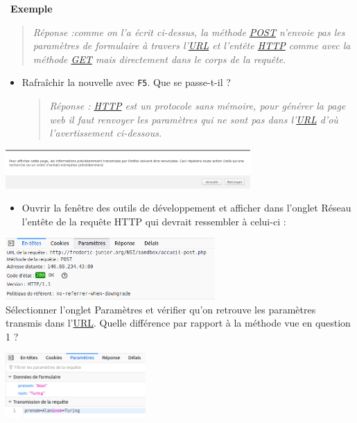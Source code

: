 \documentclass[
  11pt,
]{article}
\newcommand{\passthrough}[1]{#1}
\providecommand{\tightlist}{%
  \setlength{\itemsep}{0pt}\setlength{\parskip}{0pt}}
\newcounter{exple}
\newenvironment{exemple}[1]
{\par \medskip   \addtocounter{exple}{1} \noindent  
\begin{bclogo}[arrondi =0.1,   noborder = true, logo=\bclampe, marge=4]{~\textbf{Exemple} \textbf{\theexple} {\itshape #1} }  \par}
{
\end{bclogo}
 \par \bigskip }
\begin{document}
\begin{exemple}{}
\begin{enumerate}
  \begin{quote}
  \emph{Réponse :comme on l'a écrit ci-dessus, la méthode \url{POST}
  n'envoie pas les paramètres de formulaire à travers l'\url{URL} et
  l'entête \url{HTTP} comme avec la méthode \url{GET} mais directement
  dans le corps de la requête}.
  \end{quote}

  \begin{itemize}
  \item
    Rafraîchir la nouvelle avec \passthrough{\lstinline!F5!}. Que se
    passe-t-il ?

    \begin{quote}
    \emph{Réponse : \url{HTTP} est un protocole sans mémoire, pour
    générer la page web il faut renvoyer les paramètres qui ne sont pas
    dans l'\url{URL} d'où l'avertissement ci-dessous.}
    \end{quote}
  \end{itemize}

  \includegraphics[width=0.7\textwidth,height=\textheight]{images/avertissement-post.png}\\

  \begin{itemize}
  \tightlist
  \item
    Ouvrir la fenêtre des outils de développement et afficher dans
    l'onglet Réseau l'entête de la requête HTTP qui devrait ressembler à
    celui-ci :
  \end{itemize}

  \includegraphics[width=0.6\textwidth,height=\textheight]{images/entete-post.png}\\

  Sélectionner l'onglet Paramètres et vérifier qu'on retrouve les
  paramètres transmis dans
  l'\href{https://developer.mozilla.org/fr/docs/Glossaire/URL}{URL}.
  Quelle différence par rapport à la méthode vue en question 1 ?

  \includegraphics[width=0.4\textwidth,height=\textheight]{images/parametres2.png}\\


\end{enumerate}
\end{exemple}
\end{document}
